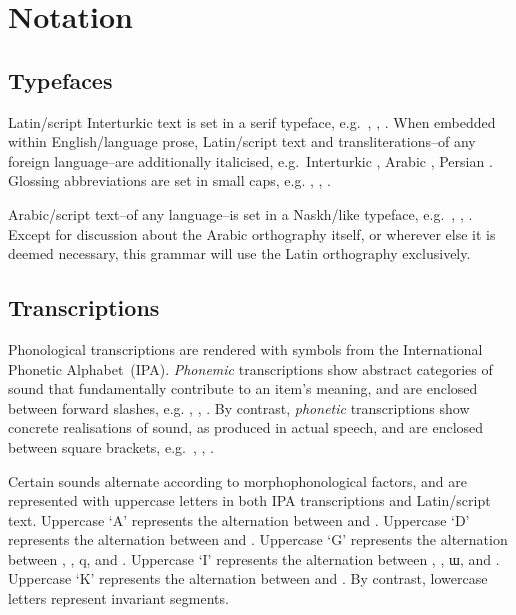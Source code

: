 \chapter{Notation}

\section*{Typefaces}

Latin\-/script Interturkic text is set in a serif typeface,
e.g.\ , , .
When embedded within English\-/language prose, Latin\-/script text and
transliterations\---of any foreign language\---are additionally italicised,
e.g.\ Interturkic , Arabic , Persian .
Glossing abbreviations are set in small caps,
e.g. \Abl, \Spl, \Prs.

Arabic\-/script text\---of any language\---is set in a Naskh\-/like typeface,
e.g.\ , , .
Except for discussion about the Arabic orthography itself, or wherever else it
is deemed necessary, this grammar will use the Latin orthography exclusively.

\section*{Transcriptions}

Phonological transcriptions are rendered with symbols from the International
Phonetic Alphabet~(IPA).
\emph{Phonemic} transcriptions show abstract categories of sound that
fundamentally contribute to an item's meaning,
and are enclosed between forward slashes,
e.g. , , .
By contrast, \emph{phonetic} transcriptions show concrete realisations of sound,
as produced in actual speech,
and are enclosed between square brackets,
e.g.\ , , .

Certain sounds alternate according to morphophonological factors,
and are represented with uppercase letters in both IPA transcriptions and
Latin\-/script text.
Uppercase `A' represents the alternation between  and .
Uppercase `D' represents the alternation between  and .
Uppercase `G' represents the alternation between , , \phonem
{q}, and .
Uppercase `I' represents the alternation between , , \phonem
{ɯ}, and .
Uppercase `K' represents the alternation between  and .
By contrast, lowercase letters represent invariant segments.

